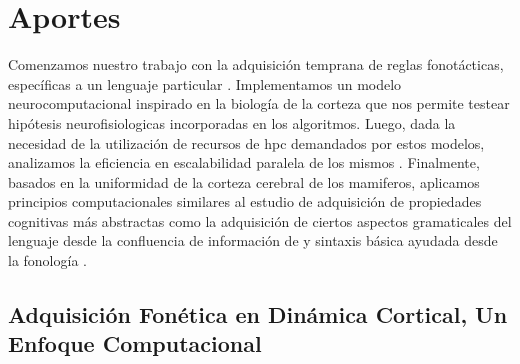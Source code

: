 




\section{Aportes}

Comenzamos nuestro trabajo con la adquisición temprana de reglas fonotácticas, específicas a un lenguaje particular \cite{10.1371/journal.pone.0217966}.
Implementamos un modelo neurocomputacional inspirado en la biología de la corteza que nos permite testear hipótesis neurofisiologicas incorporadas en los algoritmos.
Luego, dada la necesidad de la utilización de recursos de \gls{hpc} demandados por estos modelos, analizamos la eficiencia en escalabilidad paralela de los mismos \cite{}.
Finalmente, basados en la uniformidad de la corteza cerebral de los mamiferos, aplicamos principios computacionales similares al estudio de adquisición de propiedades cognitivas más abstractas como la adquisición de ciertos aspectos gramaticales del lenguaje desde la confluencia de información de  y sintaxis básica ayudada desde la fonología \cite{}.

\subsection{Adquisición Fonética en Dinámica Cortical, Un Enfoque Computacional}

